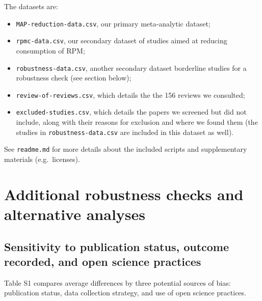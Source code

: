 \documentclass[preprint, 3p,
authoryear]{elsarticle} %
\begin{document}
The datasets are:

\begin{itemize}
\item
  \texttt{MAP-reduction-data.csv}, our primary meta-analytic dataset;
\item
  \texttt{rpmc-data.csv}, our secondary dataset of studies aimed at
  reducing consumption of RPM;
\item
  \texttt{robustness-data.csv}, another secondary dataset borderline
  studies for a robustness check (see section below);
\item
  \texttt{review-of-reviews.csv}, which details the the 156 reviews we
  consulted;
\item
  \texttt{excluded-studies.csv}, which details the papers we screened
  but did not include, along with their reasons for exclusion and where
  we found them (the studies in \texttt{robustness-data.csv} are
  included in this dataset as well).
\end{itemize}

See \texttt{readme.md} for more details about the included scripts and
supplementary materials (e.g.~licenses).

\section{Additional robustness checks and alternative
analyses}\label{additional-robustness-checks-and-alternative-analyses}

\subsection{Sensitivity to publication status, outcome recorded, and
open science
practices}\label{sensitivity-to-publication-status-outcome-recorded-and-open-science-practices}

Table S1 compares average differences by three potential sources of
bias: publication status, data collection strategy, and use of open
science practices.
\end{document}
